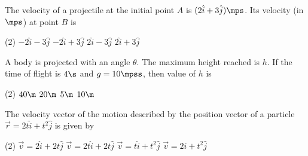  \item The velocity of a projectile at the initial point $A$ is $(2\hat{i}+3\hat{j})\mps$. Its velocity (in $\mps$) at point $B$ is
\begin{center}
\end{center}
\vspace*{-30mm}
\begin{tasks}(2)
    \task $-2\hat{i}-3\hat{j}$
    \task $-2\hat{i}+3\hat{j}$
    \task $2\hat{i}-3\hat{j}$\ans
    \task $2\hat{i}+3\hat{j}$
\end{tasks}

\item A body is projected with an angle $\theta$. The maximum height reached is $h$. If the time of flight is $4\s$ and $g=10\mpss$, then value of $h$ is
\begin{center}
\end{center}
\vspace*{-30mm}
\begin{tasks}(2)
    \task $40\m$
    \task $20\m$\ans
    \task $5\m$
    \task $10\m$
\end{tasks}

\item The velocity vector of the motion described by the position vector of a particle $\vec{r}=2t\hat{i}+t^2\hat{j}$ is given by
\begin{tasks}(2)
    \task $\Vec{v}=2\hat{i}+2t\hat{j}$\ans
    \task $\Vec{v}=2t\hat{i}+2t\hat{j}$
    \task $\Vec{v}=t\hat{i}+t^2\hat{j}$
    \task $\Vec{v}=2\hat{i}+t^2\hat{j}$
\end{tasks}

